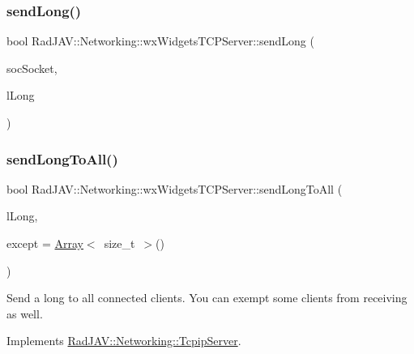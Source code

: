 \subsubsection{\texorpdfstring{send\+Long()}{sendLong()}}
{\footnotesize\ttfamily bool Rad\+J\+A\+V\+::\+Networking\+::wx\+Widgets\+T\+C\+P\+Server\+::send\+Long (\begin{DoxyParamCaption}\item[{wx\+Socket\+Base $\ast$}]{soc\+Socket,  }\item[{long}]{l\+Long }\end{DoxyParamCaption})}

\mbox{\label{class_rad_j_a_v_1_1_networking_1_1wx_widgets_t_c_p_server_a5f1f5d1adfdb67912afa5ef527766e1a}} 
\subsubsection{\texorpdfstring{send\+Long\+To\+All()}{sendLongToAll()}}
{\footnotesize\ttfamily bool Rad\+J\+A\+V\+::\+Networking\+::wx\+Widgets\+T\+C\+P\+Server\+::send\+Long\+To\+All (\begin{DoxyParamCaption}\item[{long}]{l\+Long,  }\item[{\mbox{\hyperlink{class_rad_j_a_v_1_1_array}{Array}}$<$ size\+\_\+t $>$}]{except = {\ttfamily \mbox{\hyperlink{class_rad_j_a_v_1_1_array}{Array}}$<$~size\+\_\+t~$>$()} }\end{DoxyParamCaption})\hspace{0.3cm}{\ttfamily [virtual]}}

Send a long to all connected clients. You can exempt some clients from receiving as well. 

Implements \mbox{\hyperlink{class_rad_j_a_v_1_1_networking_1_1_tcpip_server_a54e65701f913a800034b8eca4a16e5eb}{Rad\+J\+A\+V\+::\+Networking\+::\+Tcpip\+Server}}.

\mbox{\label{class_rad_j_a_v_1_1_networking_1_1wx_widgets_t_c_p_server_a109a7cfe9f0aed3c0ab385e22b7dccfc}} 
